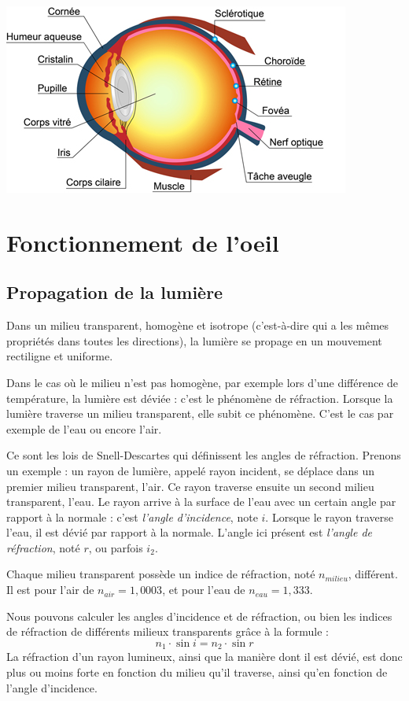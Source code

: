 \documentclass[a4paper, 12pt, onecolumn, openany]{report}
\begin{document}
	\includegraphics[scale=0.8]{schema_oeil.jpg}
\newpage
	\section{Fonctionnement de l'oeil}
		\subsection{Propagation de la lumière}
		Dans un milieu transparent, homogène et isotrope (c’est-à-dire qui a les mêmes propriétés dans toutes les directions), la lumière se propage en un mouvement rectiligne et uniforme.
		
	Dans le cas où le milieu n’est pas homogène, par exemple lors d’une différence de température, la lumière est déviée : c'est le phénomène de réfraction. Lorsque la lumière traverse un milieu transparent, elle subit ce phénomène. C’est le cas par exemple de l’eau ou encore l'air. 
	
	Ce sont les lois de Snell-Descartes qui définissent les angles de réfraction. Prenons un exemple : un rayon de lumière, appelé rayon incident, se déplace dans un premier milieu transparent, l'air. Ce rayon traverse ensuite un second milieu transparent, l'eau. Le rayon arrive à la surface de l'eau avec un certain angle par rapport à la normale : c'est \textit{l'angle d'incidence}, note $i$. Lorsque le rayon traverse l'eau, il est dévié par rapport à la normale. L'angle ici présent est \textit{l'angle de réfraction}, noté $r$, ou parfois $i_{2}$.
	
	Chaque milieu transparent possède un indice de réfraction, noté $n_{milieu}$, différent. Il est pour l'air de $n_{air} = 1,0003$, et pour l'eau de $n_{eau} = 1,333$.
	
	Nous pouvons calculer les angles d'incidence et de réfraction, ou bien les indices de réfraction de différents milieux transparents grâce à la formule :	
	\[
	n_{1} \cdot \sin i = n_{2} \cdot \sin r
	\]	
	La réfraction d’un rayon lumineux, ainsi que la manière dont il est dévié, est donc plus ou moins forte en fonction du milieu qu’il traverse, ainsi qu’en fonction de l’angle d’incidence.
	
\end{document}
